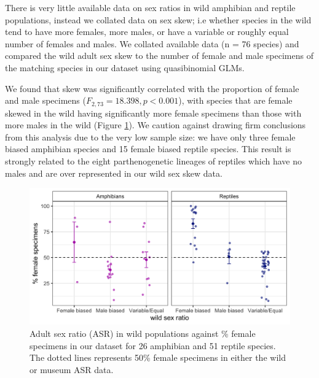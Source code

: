 \documentclass[a4paper, 12pt]{article}
\begin{document}
There is very little available data on sex ratios in wild amphibian and reptile populations, instead we collated data on sex skew; i.e whether species in the wild tend to have more females, more males, or have a variable or roughly equal number of females and males. We collated available data (n = 76 species) and compared the wild adult sex skew to the number of female and male specimens of the matching species in our dataset using quasibinomial GLMs. 

We found that skew was significantly correlated with the proportion of female and male specimens ($F_{2,73} = 18.398, p < 0.001$), with species that are female skewed in the wild having significantly more female specimens than those with more males in the wild (Figure \ref{fig-wild}). We caution against drawing firm conclusions from this analysis due to the very low sample size: we have only three female biased amphibian species and 15 female biased reptile species. This result is strongly related to the eight parthenogenetic lineages of reptiles which have no males and are over represented in our wild sex skew data.  

\begin{figure}[H]
 \centering
  \includegraphics[width = \linewidth]{figures/wild-sex-ratios.png}
  \caption{Adult sex ratio (ASR) in wild populations against \% female specimens in our dataset for 26 amphibian and 51 reptile species. The dotted lines represents 50\% female specimens in either the wild or museum ASR data.}
  \label{fig-wild}
\end{figure}


%
\end{document}
